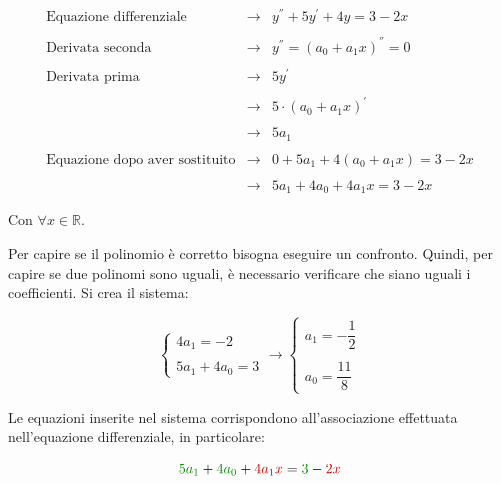 \documentclass[a4paper]{article}
\begin{document}
	\begin{equation*}
		\begin{array}{lll}
			\text{Equazione differenziale} 	& \longrightarrow & y^{''} + 5y^{'} + 4y = 3 - 2x \\
			&& \\
			\text{Derivata seconda}			& \longrightarrow & y^{''} = \left(a_{0}+a_{1}x\right)^{''} = 0 \\
			&& \\
			\text{Derivata prima}			& \longrightarrow & 5y^{'} \\
			&& \\
											& \longrightarrow & 5\cdot\left(a_{0}+a_{1}x\right)^{'} \\
			&& \\
											& \longrightarrow & 5a_{1} \\
			&& \\
			\text{Equazione dopo aver sostituito} & \longrightarrow & 0 + 5a_{1} + 4\left(a_{0}+a_{1}x\right) = 3-2x \\
			&& \\
											& \longrightarrow & 5a_{1} + 4a_{0} + 4a_{1}x = 3 - 2x
		\end{array}
	\end{equation*}

	\noindent
	Con $\forall x \in \mathbb{R}$.

	\newpage

	\noindent
	Per capire se il polinomio è corretto bisogna eseguire un confronto. Quindi, per capire se due polinomi sono uguali, è necessario verificare che siano uguali i coefficienti. Si crea il sistema:
	
	\begin{equation*}
		\begin{cases}
			4a_{1} = -2 \\
			\\
			5a_{1} + 4a_{0} = 3
		\end{cases}
		\longrightarrow
		\begin{cases}
			a_{1} = -\dfrac{1}{2} \\
			\\
			a_{0} = \dfrac{11}{8}
		\end{cases}
	\end{equation*}

	\noindent
	Le equazioni inserite nel sistema corrispondono all'associazione effettuata nell'equazione differenziale, in particolare:
	
	\begin{equation*}
		\textcolor{Green4}{5a_{1}} + \textcolor{Green4}{4a_{0}} + \textcolor{Red3}{4a_{1}x} = \textcolor{Green4}{3} - \textcolor{Red3}{2x}
	\end{equation*}
\end{document}
